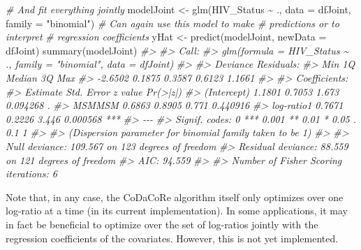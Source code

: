 \documentclass[
]{article}
\newenvironment{Shaded}{\begin{snugshade}}{\end{snugshade}}
\newcommand{\AttributeTok}[1]{\textcolor[rgb]{0.77,0.63,0.00}{#1}}
\newcommand{\CommentTok}[1]{\textcolor[rgb]{0.56,0.35,0.01}{\textit{#1}}}
\newcommand{\FunctionTok}[1]{\textcolor[rgb]{0.00,0.00,0.00}{#1}}
\newcommand{\NormalTok}[1]{#1}
\newcommand{\OtherTok}[1]{\textcolor[rgb]{0.56,0.35,0.01}{#1}}
\newcommand{\SpecialCharTok}[1]{\textcolor[rgb]{0.00,0.00,0.00}{#1}}
\newcommand{\StringTok}[1]{\textcolor[rgb]{0.31,0.60,0.02}{#1}}
\begin{document}
\begin{Shaded}
\begin{Highlighting}[]
\CommentTok{\# And fit everything jointly}
\NormalTok{modelJoint }\OtherTok{\textless{}{-}} \FunctionTok{glm}\NormalTok{(HIV\_Status }\SpecialCharTok{\textasciitilde{}}\NormalTok{ ., }\AttributeTok{data =}\NormalTok{ dfJoint,}
    \AttributeTok{family =} \StringTok{"binomial"}\NormalTok{)}
\CommentTok{\# Can again use this model to make}
\CommentTok{\# predictions or to interpret}
\CommentTok{\# regression coefficients}
\NormalTok{yHat }\OtherTok{\textless{}{-}} \FunctionTok{predict}\NormalTok{(modelJoint, }\AttributeTok{newData =}\NormalTok{ dfJoint)}
\FunctionTok{summary}\NormalTok{(modelJoint)}
\CommentTok{\#\textgreater{} }
\CommentTok{\#\textgreater{} Call:}
\CommentTok{\#\textgreater{} glm(formula = HIV\_Status \textasciitilde{} ., family = "binomial", data = dfJoint)}
\CommentTok{\#\textgreater{} }
\CommentTok{\#\textgreater{} Deviance Residuals: }
\CommentTok{\#\textgreater{}     Min       1Q   Median       3Q      Max  }
\CommentTok{\#\textgreater{} {-}2.6502   0.1875   0.3587   0.6123   1.1661  }
\CommentTok{\#\textgreater{} }
\CommentTok{\#\textgreater{} Coefficients:}
\CommentTok{\#\textgreater{}              Estimate Std. Error z value Pr(\textgreater{}|z|)    }
\CommentTok{\#\textgreater{} (Intercept)    1.1801     0.7053   1.673 0.094268 .  }
\CommentTok{\#\textgreater{} MSMMSM         0.6863     0.8905   0.771 0.440916    }
\CommentTok{\#\textgreater{} \textasciigrave{}log{-}ratio1\textasciigrave{}   0.7671     0.2226   3.446 0.000568 ***}
\CommentTok{\#\textgreater{} {-}{-}{-}}
\CommentTok{\#\textgreater{} Signif. codes:  0 \textquotesingle{}***\textquotesingle{} 0.001 \textquotesingle{}**\textquotesingle{} 0.01 \textquotesingle{}*\textquotesingle{} 0.05 \textquotesingle{}.\textquotesingle{} 0.1 \textquotesingle{} \textquotesingle{} 1}
\CommentTok{\#\textgreater{} }
\CommentTok{\#\textgreater{} (Dispersion parameter for binomial family taken to be 1)}
\CommentTok{\#\textgreater{} }
\CommentTok{\#\textgreater{}     Null deviance: 109.567  on 123  degrees of freedom}
\CommentTok{\#\textgreater{} Residual deviance:  88.559  on 121  degrees of freedom}
\CommentTok{\#\textgreater{} AIC: 94.559}
\CommentTok{\#\textgreater{} }
\CommentTok{\#\textgreater{} Number of Fisher Scoring iterations: 6}
\end{Highlighting}
\end{Shaded}

Note that, in any case, the CoDaCoRe algorithm itself only optimizes
over one log-ratio at a time (in its current implementation). In some
applications, it may in fact be beneficial to optimize over the set of
log-ratios jointly with the regression coefficients of the covariates.
However, this is not yet implemented.
\end{document}
